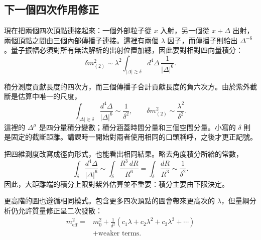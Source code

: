 \subsection{下一個四次作用修正}

現在把兩個四次頂點連接起來：一個外部粒子從 \(x\) 入射，另一個從 \(x+\Delta\) 出射，兩個頂點之間由三個內部傳播子連接。這裡有兩個 \(\lambda\) 因子，而傳播子則給出 \(\Delta^{-6}\)。量子振幅必須對所有無法解析的出射位置加總，因此要對相對四向量積分：
\begin{equation}
\delta m^2_{(2)}
\sim
\lambda^2
\int_{|\Delta|\gtrsim\delta}
d^4\Delta\,\frac{1}{|\Delta|^6}.
\label{eq:two-loop-power-count}
\end{equation}

\begin{classroomqa}
\end{classroomqa}

積分測度貢獻長度的四次方，而三個傳播子合計貢獻長度的負六次方。由於紫外截斷是估算中唯一的尺度，
\begin{equation}
\int_{|\Delta|\gtrsim\delta}
\frac{d^4\Delta}{|\Delta|^6}
\sim\frac{1}{\delta^2},
\qquad
\delta m^2_{(2)}
\sim\frac{\lambda^2}{\delta^2}.
\label{eq:two-loop-scalar-mass}
\end{equation}
這裡的 \(\Delta^\mu\) 是四分量積分變數；積分涵蓋時間分量和三個空間分量。小寫的 \(\delta\) 則是固定的截斷距離。講課時一開始對兩者使用相同的口頭稱呼，之後才更正記號。

把四維測度改寫成徑向形式，也能看出相同結果。略去角度積分所給的常數，
\begin{equation}
\int_{\delta}\frac{d^4\Delta}{|\Delta|^6}
\sim
\int_{\delta}\frac{R^3\,dR}{R^6}
=\int_{\delta}\frac{dR}{R^3}
\sim\frac{1}{\delta^2}.
\end{equation}
因此，大距離端的積分上限對紫外估算並不重要：積分主要由下限決定。

更高階的圖也遵循相同模式。包含更多四次頂點的圖會帶來更高次的 \(\lambda\)，但量綱分析仍允許質量修正呈二次發散：
\begin{equation}
\begin{aligned}
m_{\mathrm{eff}}^2
={}&m_0^2
+\frac{1}{\delta^2}
\left(c_1\lambda+c_2\lambda^2+c_3\lambda^3+\cdots\right)\\
&+\text{weaker terms}.
\end{aligned}
\label{eq:scalar-mass-series}
\end{equation}

